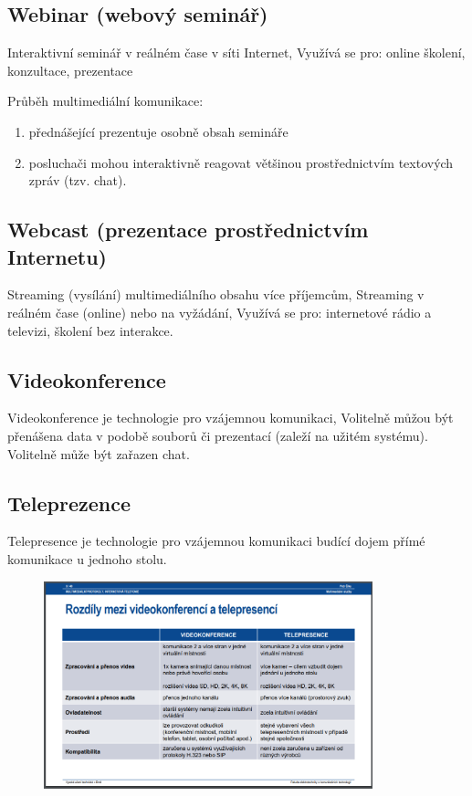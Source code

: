\subsection{Webinar (webový seminář)}
Interaktivní seminář v reálném čase v síti Internet, Využívá se pro: online školení, konzultace,
prezentace

Průběh multimediální komunikace:
\begin{enumerate}
    \item přednášející prezentuje osobně obsah semináře
    \item posluchači mohou interaktivně reagovat většinou prostřednictvím textových zpráv (tzv. chat).
\end{enumerate}


\subsection{Webcast (prezentace prostřednictvím Internetu)}
Streaming (vysílání) multimediálního obsahu více příjemcům, Streaming v reálném čase (online) nebo na vyžádání, Využívá se pro: internetové rádio a televizi, školení bez interakce.

\subsection{Videokonference}
Videokonference je technologie pro vzájemnou komunikaci, Volitelně můžou být přenášena data v podobě souborů či prezentací (zaleží na užitém
systému).
Volitelně může být zařazen chat.



\subsection{Teleprezence}
Telepresence je technologie pro vzájemnou komunikaci budící dojem přímé komunikace u jednoho stolu.


\begin{figure} [h]
     \centering
     \includegraphics[width=0.85\textwidth]{images/teleVSvideo.PNG}
\end{figure}

